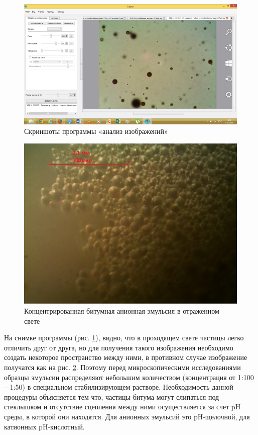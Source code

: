 \begin{figure}[h]
	\centering
	\includegraphics{images/em_03}
	\caption{Скриншоты программы «анализ изображений»}
	\label{em_img_program}
\end{figure}

\begin{figure}[h]
	\centering
	\includegraphics{images/em_01}
	\caption{Концентрированная битумная анионная эмульсия в отраженном свете}
	\label{em_img_bad}
\end{figure}

На снимке программы (рис. \ref{em_img_program}), видно, что в проходящем свете частицы легко отличить друг от друга, но для получения такого изображения необходимо создать некоторое пространство между ними, в противном случае изображение получатся как на рис. \ref{em_img_bad}. Поэтому перед микроскопическими исследованиями образцы эмульсии распределяют небольшим количеством (концентрация от 1:100 – 1:50) в специальном стабилизирующем растворе. Необходимость данной процедуры объясняется тем что, частицы битума могут слипаться под стеклышком и отсутствие сцепления между ними осуществляется за счет pH среды, в которой они находятся. Для анионных эмульсий это pH-щелочной, для катионных pH-кислотный.

